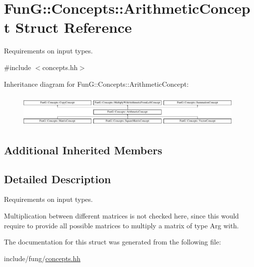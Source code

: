 \hypertarget{structFunG_1_1Concepts_1_1ArithmeticConcept}{}\section{FunG\+:\+:Concepts\+:\+:Arithmetic\+Concept Struct Reference}
\label{structFunG_1_1Concepts_1_1ArithmeticConcept}


Requirements on input types.  




{\ttfamily \#include $<$concepts.\+hh$>$}

Inheritance diagram for FunG\+:\+:Concepts\+:\+:Arithmetic\+Concept\+:\begin{figure}[H]
\begin{center}
\leavevmode
\includegraphics[height=1.661721cm]{structFunG_1_1Concepts_1_1ArithmeticConcept}
\end{center}
\end{figure}
\subsection*{Additional Inherited Members}


\subsection{Detailed Description}
Requirements on input types. 

Multiplication between different matrices is not checked here, since this would require to provide all possible matrices to multiply a matrix of type Arg with. 

The documentation for this struct was generated from the following file\+:\begin{DoxyCompactItemize}
\item 
include/fung/\hyperlink{concepts_8hh}{concepts.\+hh}\end{DoxyCompactItemize}
